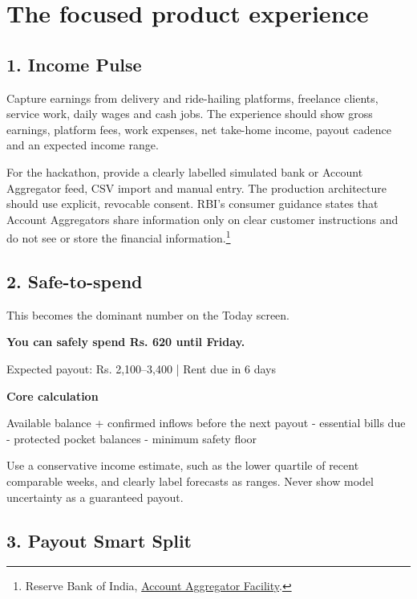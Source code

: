 \documentclass[10pt,a4paper]{article}
\begin{document}
\section{The focused product experience}

\subsection{1. Income Pulse}

Capture earnings from delivery and ride-hailing platforms, freelance clients, service work, daily wages and cash jobs. The experience should show gross earnings, platform fees, work expenses, net take-home income, payout cadence and an expected income range.

For the hackathon, provide a clearly labelled simulated bank or Account Aggregator feed, CSV import and manual entry. The production architecture should use explicit, revocable consent. RBI's consumer guidance states that Account Aggregators share information only on clear customer instructions and do not see or store the financial information.\footnote{Reserve Bank of India, \href{https://rbikehtahai.rbi.org.in/AccountAggregatorFacility.html}{Account Aggregator Facility}.}

\subsection{2. Safe-to-spend}

This becomes the dominant number on the Today screen.

\begin{goodbox}
{\Large\bfseries You can safely spend \textcolor{Good}{Rs. 620} until Friday.}\par
\small Expected payout: Rs. 2,100--3,400 \quad | \quad Rent due in 6 days
\end{goodbox}

\textbf{Core calculation}

\begin{accentbox}
Available balance + confirmed inflows before the next payout - essential bills due - protected pocket balances - minimum safety floor
\end{accentbox}

Use a conservative income estimate, such as the lower quartile of recent comparable weeks, and clearly label forecasts as ranges. Never show model uncertainty as a guaranteed payout.

\subsection{3. Payout Smart Split}
\end{document}
